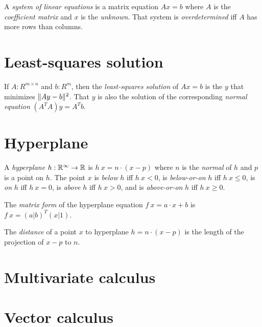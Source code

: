 %
%
%
%
A \emph{system of linear equations} is a matrix equation \(A x = b\)
where \(A\) is the \emph{coefficient matrix} and \(x\) is the \emph{unknown}.
%
%
That system is \emph{overdetermined} iff \(A\) has more rows than columns.

\section{Least-squares solution}

%
%
%
If \(A : R^{m \times n}\) and \(b : R^m\),
then the \emph{least-squares solution} of \(A x = b\)
is the \(y\) that minimizes \(\lVert A y - b\rVert^2\).
%
That \(y\) is also the solution of the corresponding \emph{normal equation}
\((A^T A) y = A^T b\).

\section{Hyperplane}

%
%
%
%
%
%
A \emph{hyperplane}
\(h : \mathbb{R}^\infty \to \mathbb{R}\)
is \(h~x = n \cdot (x - p)\)
where \(n\) is the \emph{normal} of \(h\)
and \(p\) is a point on \(h\).
The point \(x\)
is \emph{below} \(h\) iff \( h~x < 0 \),
is \emph{below-or-on} \(h\) iff \( h~x \le 0 \),
is \emph{on} \(h\) iff \( h~x = 0 \),
is \emph{above} \(h\) iff \( h~x > 0 \),
and
is \emph{above-or-on} \(h\) iff \( h~x \ge 0 \).

%
%
The \emph{matrix form} of the hyperplane equation \(f~x = a \cdot x + b\)
is \(f~x = (a|b)^T (x|1)\).

The \emph{distance} of a point \(x\) to hyperplane \(h = n \cdot (x - p)\)
is the length of the projection of \(x-p\) to \(n\).

\section{Multivariate calculus}

\section{Vector calculus}

